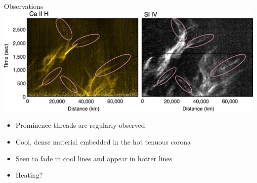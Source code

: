 \documentclass[10pt,aspectratio=169,usenames,dvipsnames]{beamer}
\begin{document}


\begin{frame}{Observations}
\centering
\includegraphics[width=0.95\linewidth]{2023Dundee/Figures/observation.png}
\begin{itemize}
    \item Prominence threads are regularly observed
    \item Cool, dense material embedded in the hot tenuous corona
    \item Seen to fade in cool lines and appear in hotter lines
    \item Heating?
\end{itemize}
\end{frame}
\end{document}
